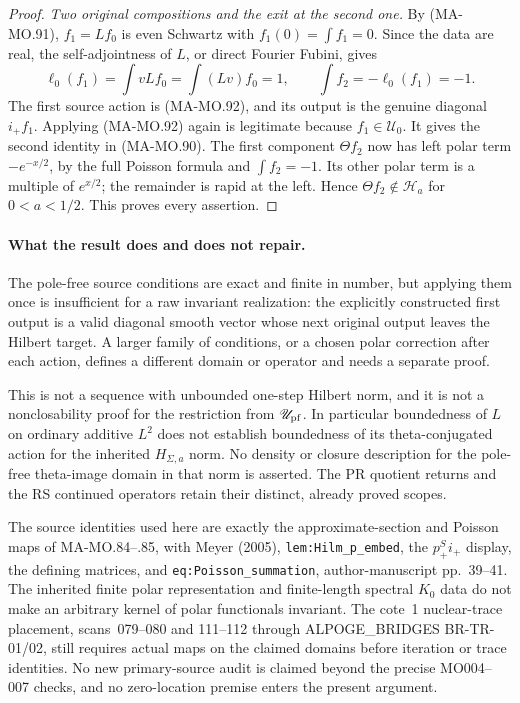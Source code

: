 \begin{proof}
\emph{Two original compositions and the exit at the second one.}
By (MA-MO.91), \(f_1=Lf_0\) is even Schwartz with
\(f_1(0)=\int f_1=0\). Since the data are real, the
self-adjointness of \(L\), or direct Fourier Fubini, gives
\[
 \ell_0(f_1)=\int vLf_0=\int (Lv)f_0=1,
               \qquad \int f_2=-\ell_0(f_1)=-1.
 \tag{MA-MO.99}
\]
The first source action is (MA-MO.92), and its output is the
genuine diagonal \(i_+f_1\). Applying (MA-MO.92) again is
legitimate because \(f_1\in\mathscr U_0\). It gives the
second identity in (MA-MO.90). The first component
\(\Theta f_2\) now has left polar term \(-e^{-x/2}\),
by the full Poisson formula and \(\int f_2=-1\). Its other
polar term is a multiple of \(e^{x/2}\); the remainder is
rapid at the left. Hence \(\Theta f_2\notin\mathcal H_a\)
for \(0<a<1/2\). This proves every assertion.
\end{proof}

\paragraph{What the result does and does not repair.}
The pole-free source conditions are exact and finite in number,
but applying them once is insufficient for a raw invariant
realization: the explicitly constructed first output is a valid
diagonal smooth vector whose next original output leaves the
Hilbert target. A larger family of conditions, or a chosen
polar correction after each action, defines a different domain
or operator and needs a separate proof.

This is not a sequence with unbounded one-step Hilbert norm,
and it is not a nonclosability proof for the restriction from
\(\mathscr U_{\rm pf}\). In particular boundedness of \(L\)
on ordinary additive \(L^2\) does not establish boundedness
of its theta-conjugated action for the inherited
\(H_{\Sigma,a}\) norm. No density or closure description
for the pole-free theta-image domain in that norm is asserted.
The PR quotient returns and the RS continued operators retain
their distinct, already proved scopes.

The source identities used here are exactly the approximate-section
and Poisson maps of MA-MO.84--.85, with Meyer (2005),
\texttt{lem:Hilm\_p\_embed}, the \(p_+^S i_+\) display,
the defining matrices, and \texttt{eq:Poisson\_summation},
author-manuscript pp.~39--41. The inherited finite polar
representation and finite-length spectral \(K_0\) data do
not make an arbitrary kernel of polar functionals invariant.
The cote~1 nuclear-trace placement, scans~079--080 and
111--112 through ALPOGE\_BRIDGES BR-TR-01/02, still requires
actual maps on the claimed domains before iteration or trace
identities. No new primary-source audit is claimed beyond
the precise MO004--007 checks, and no zero-location premise
enters the present argument.
